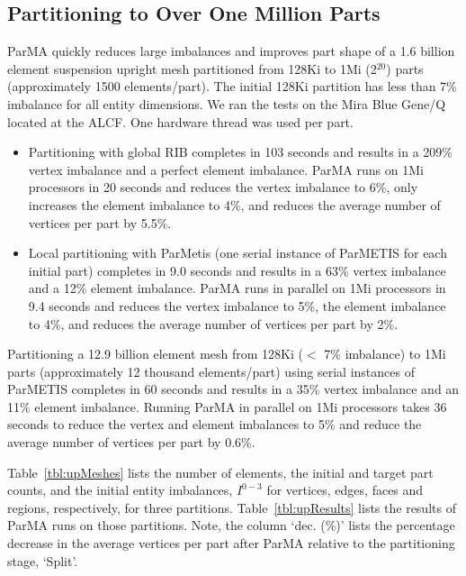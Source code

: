 \subsection{Partitioning to Over One Million Parts}

ParMA quickly reduces large imbalances and improves part shape of a 1.6 billion
element suspension upright mesh partitioned from 128Ki to 1Mi
(2$^{20}$) parts (approximately 1500 elements/part).
The initial 128Ki partition has less than 7\% imbalance for all entity
dimensions.
We ran the tests on the Mira Blue Gene/Q located at the ALCF.
One hardware thread was used per part.
\begin{itemize}
  \item Partitioning with global RIB completes in 103 seconds and results in a
    209\% vertex imbalance and a perfect element imbalance.
    ParMA runs on 1Mi processors in 20 seconds and reduces the vertex imbalance
    to 6\%, only increases the element imbalance to 4\%, and reduces the average
    number of vertices per part by 5.5\%.
  \item Local partitioning with ParMetis (one serial instance of ParMETIS for each
    initial part) completes in 9.0 seconds and results in a 63\% vertex
    imbalance and a 12\% element imbalance.
    ParMA runs in parallel on 1Mi processors in 9.4 seconds and reduces the
    vertex imbalance to 5\%, the element imbalance to 4\%, and reduces the
    average number of vertices per part by 2\%.
\end{itemize}
Partitioning a 12.9 billion element mesh from 128Ki ($<$ 7\% imbalance) to 1Mi
parts (approximately 12 thousand elements/part) using serial instances of ParMETIS
completes in 60 seconds and results in a 35\% vertex imbalance and an 11\%
element imbalance.
Running ParMA in parallel on 1Mi processors takes 36 seconds to reduce the
vertex and element imbalances to 5\% and reduce the average number of vertices
per part by 0.6\%.

Table~\ref{tbl:upMeshes} lists the number of elements, the initial and target
part counts, and the initial entity imbalances, $I^{0-3}$ for vertices, edges,
faces and regions, respectively, for three partitions.
Table~\ref{tbl:upResults} lists the results of ParMA runs on those partitions.
Note, the column `dec. (\%)' lists the percentage decrease in the average
vertices per part after ParMA relative to the partitioning stage, `Split'.

